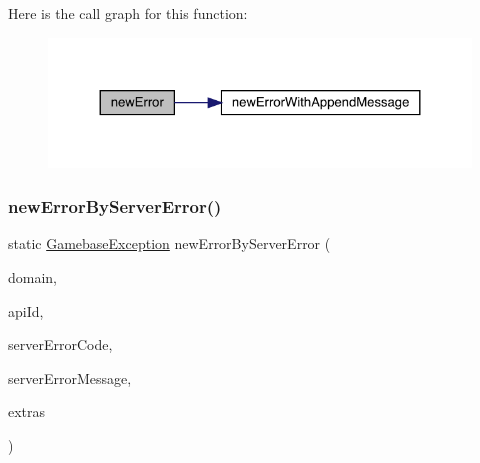 Here is the call graph for this function\+:
\nopagebreak
\begin{figure}[H]
\begin{center}
\leavevmode
\includegraphics[width=324pt]{classcom_1_1toast_1_1android_1_1gamebase_1_1base_1_1_gamebase_error_a65b209f183118b929f313eedbadcfc71_cgraph}
\end{center}
\end{figure}
\mbox{\label{classcom_1_1toast_1_1android_1_1gamebase_1_1base_1_1_gamebase_error_af6a27716a44f247527608e14098bb01b}} 
\subsubsection{\texorpdfstring{new\+Error\+By\+Server\+Error()}{newErrorByServerError()}}
{\footnotesize\ttfamily static \hyperlink{classcom_1_1toast_1_1android_1_1gamebase_1_1base_1_1_gamebase_exception}{Gamebase\+Exception} new\+Error\+By\+Server\+Error (\begin{DoxyParamCaption}\item[{@Non\+Null final String}]{domain,  }\item[{@Non\+Null final String}]{api\+Id,  }\item[{final int}]{server\+Error\+Code,  }\item[{@Nullable final String}]{server\+Error\+Message,  }\item[{@Nullable final Map$<$ String, Object $>$}]{extras }\end{DoxyParamCaption})\hspace{0.3cm}{\ttfamily [static]}}

